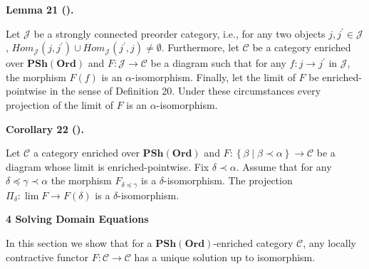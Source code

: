 \documentclass[10pt,a4paper]{article}
\begin{document}
 
 
 
\par\medskip\noindent\textbf{Lemma 21 ().}\par
 
 
Let $\mathcal{J}$ be a strongly connected preorder category, i.e., for any two objects $j,j^{\prime}\in\mathcal{J}$, $\mathit{Hom}_{\mathcal{J}}(j,j^{\prime})\cup\mathit{Hom}_{\mathcal{J}}(j^{\prime},j)\neq\emptyset$. Furthermore, let $\mathcal{C}$ be a category enriched over $\mathbf{PSh}(\mathbf{Ord})$ and $F:\mathcal{J}\to\mathcal{C}$ be a diagram such that for any $f:j\to j^{\prime}$ in $\mathcal{J}$, the morphism $F(f)$ is an $\alpha$-isomorphism. Finally, let the limit of $F$ be enriched-pointwise in the sense of Definition 20. Under these circumstances every projection of the limit of $F$ is an $\alpha$-isomorphism.\par
 
 
 
 
\par\medskip\noindent\textbf{Corollary 22 ().}\par
 
 
Let $\mathcal{C}$ a category enriched over $\mathbf{PSh}(\mathbf{Ord})$ and $F:\left\{\beta\middle|\beta\prec\alpha\right\}\to\mathcal{C}$ be a diagram whose limit is enriched-pointwise. Fix $\delta\prec\alpha$. Assume that for any $\delta\preceq\gamma\prec\alpha$ the morphism $F_{\delta\preceq\gamma}$ is a $\delta$-isomorphism. The projection $\Pi_{\delta}:\lim F\to F(\delta)$ is a $\delta$-isomorphism.\par
 
 
 
 


 
\par\medskip\noindent\textbf{4 Solving Domain Equations}\par
 
 
In this section we show that for a $\mathbf{PSh}(\mathbf{Ord})$-enriched category $\mathcal{C}$, any locally contractive functor $F:\mathcal{C}\to\mathcal{C}$ has a unique solution up to isomorphism.\par
 
\end{document}
